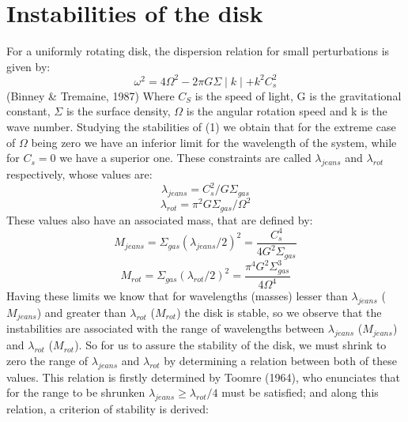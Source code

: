 \documentclass{aa}
\begin{document}
\section{Instabilities of the disk}
   For a uniformly rotating disk, the dispersion relation for small perturbations is given by:
   \begin{equation}
       \omega^2 = 4\Omega^2 - 2\pi G \Sigma\mid k \mid + k^2C_{s}^2
   \end{equation}
   (Binney \& Tremaine, 1987) Where $C_S$ is the speed of light,  G is the gravitational constant, $\Sigma$ is the surface density, $\Omega$ is the angular rotation speed and k is the wave number.
   Studying the stabilities of (1) we obtain that for the extreme case of $\Omega$ being zero we have an inferior limit for the wavelength of the system, while for $C_s = 0$ we have a superior one. These constraints are called $\lambda_{jeans}$ and $\lambda_{rot}$ respectively, whose values are:\\
   \begin{equation}
       \lambda_{jeans} = C_s^2/ G \Sigma_{gas}
   \end{equation}
   \begin{equation}
       \lambda_{rot} = \pi^2 G \Sigma_{gas} / \Omega^2 
   \end{equation}
   These values also have an associated mass, that are defined by: 
   \begin{equation}
       M_{jeans} = \Sigma_{gas}(\lambda_{jeans}/2)^2 = \frac{C_s^4}{4 G^2 \Sigma_{gas}}
   \end{equation}
   \begin{equation}
       M_{rot} = \Sigma_{gas}(\lambda_{rot}/2)^2 = \frac{\pi^4 G^2 \Sigma_{gas}^3}{4 \Omega^4}
   \end{equation}
   Having these limits we know that for wavelengths (masses) lesser than $\lambda_{jeans}$ ($M_{jeans}$) and greater than $\lambda_{rot}$ ($M_{rot}$) the disk is stable, so we observe that the instabilities are associated with the range of wavelengths between $\lambda_{jeans}$ ($M_{jeans}$) and $\lambda_{rot}$ ($M_{rot}$). So for us to assure the stability of the disk, we must shrink to zero the range of  $\lambda_{jeans}$ and $\lambda_{rot}$ by determining a relation between both of these values. This relation is firstly determined by Toomre (1964), who enunciates that for the range to be shrunken $\lambda_{jeans} \geqslant \lambda_{rot}/4$ must be satisfied; and along this relation, a criterion of stability is derived:
\end{document}
